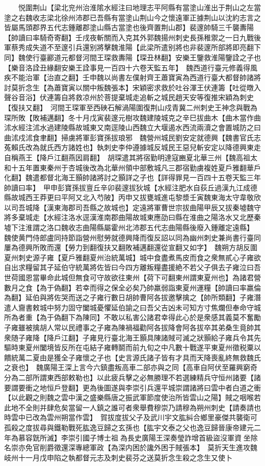 　　悦圍荆山【梁北兖州治淮隂水經注曰地理志平阿縣有當塗山淮出于荆山之左當塗之右魏收志梁北徐州沛郡已吾縣有當塗山荆山今之懷遠軍正據荆山以沈約志言之皆屬馬頭郡界五代志鍾離郡塗山縣古當塗也後齊置荆山郡】裴邃帥騎三千襲夀陽【帥讀曰率騎奇寄翻】壬戌夜斬關而入克其外郭魏揚州刺史長孫稚禦之一日九戰後軍蔡秀成失道不至邃引兵還别將擊魏淮陽【此梁所遣别將也非裴邃所部將即亮翻下同】魏使行臺酈道元都督河間王琛救夀陽【琛丑林翻】安樂王鑒救淮陽鑒詮之子也【樂音洛詮丑緣翻安樂王詮事見一百四十六卷天監五年】　魏西道行臺元修義得風疾不能治軍【治直之翻】壬申魏以尚書左僕射齊王蕭寶寅為西道行臺大都督帥諸將討莫折念生【為蕭寶寅以關中叛魏張本】宋穎密求救於吐谷渾王伏連籌【吐從暾入聲谷音浴】伏連籌自將救凉州於菩提棄城走追斬之城民趙天安等復推宋穎為刺史【復扶又翻】　河間王琛軍至西硤石解渦陽圍復荆山戍青冀二州刺史王神念與戰為琛所敗【敗補邁翻】冬十月戊寅裴邃元樹攻魏建陵城克之辛巳拔曲木【曲木當作曲沭水經注沭水過建陵縣故城東又南逕陵山西魏立大堰遏水西流兩瀆之會置城防之曰曲沭戍沭食聿翻】掃虜將軍彭寶孫拔琅邪　魏營州城民劉安定就德興【魏書官氏志菟賴氏改為就氏西方諸姓也】執刺史李仲遵據城反城民王惡兒斬安定以降德興東走自稱燕王【降戶江翻燕因肩翻】　胡琛遣其將宿勤明達寇豳夏北華三州【魏高祖太和十五年置東秦州于杏城後改為北華州領中部敷城凡三郡宿勤虜複姓夏戶雅翻華戶化翻】魏遣都督北海王顥帥諸將討之顥詳之子也【詳得罪見一百四十五卷天監三年帥讀曰率】　甲申彭寶孫拔亶丘辛卯裴邃拔狄城【水經注肥水自荻丘過漢九江成德縣故城西王莽更曰平阿又北入芍陂】丙申又拔甕城進屯黎漿壬寅魏東海太守韋敬欣以司吾城降【漢東海郡司吾縣之故城也】定遠將軍曹世宗拔曲陽甲辰又拔秦墟魏守將多棄城走【水經注洛水逕漢淮南郡曲陽故城東應劭曰縣在淮曲之陽洛水又北歷秦墟下注淮謂之洛口魏收志曲陽縣屬霍州北沛郡五代志曲陽縣後廢入鍾離定遠縣】　魏使黄門侍郎盧同持節詣營州慰勞就德興降而復反詔以同為幽州刺史兼尚書行臺同屢為德興所敗而還【勞力到翻復扶又翻敗補邁翻還從宣翻又如字】　魏朔方胡反圍夏州刺史源子雍【夏戶雅翻夏州治統萬城】城中食盡煮馬皮而食之衆無貳心子雍欲自出求糧留其子延伯守統萬將佐皆曰今四方離叛糧盡援絶不若父子俱去子雍泣曰吾世荷國恩當畢命此城但無食可守故欲往東州【荷下可翻東州謂東夏州也】為諸君營數月之食【為于偽翻】若幸而得之保全必矣乃帥羸弱詣東夏州運糧【帥讀曰率羸倫為翻】延伯與將佐哭而送之子雍行數日胡帥曹阿各拔邀擊擒之【帥所類翻】子雍潛遣人齎書敕城中努力固守闔城憂懼延伯諭之曰吾父吉凶未可知方寸焦爛但奉命守城所為者重【為于偽翻下為陳同】不敢以私害公諸君幸得此心於是衆感其義莫不奮勵子雍雖被擒胡人常以民禮事之子雍為陳禍福勸阿各拔降會阿各拔卒其弟桑生竟帥其衆随子雍降【降戶江翻】子雍見行臺北海王顥具陳諸賊可滅之狀顥給子雍兵令其先驅時東夏州闔境皆反所在屯結子雍轉鬬而前九旬之中凡數十戰遂平東夏州徵税粟以饋統萬二夏由是獲全子雍懷之子也【史言源氏諸子皆有才具而天降喪亂終無救魏氏之衰也】　魏廣陽王深上言今六鎮盡叛高車二部亦與之同【高車自阿伏至羅興窮奇分為二部所謂東西部敕勒也】以此疲兵擊之必無勝理不若選練精兵守恒州諸要【諸要謂要衝之地恒戶登翻】更為後圖遂與李崇引兵還平城崇謂諸將曰雲中者白道之衝【以此觀之則魏之雲中漢之盛樂縣唐之振武軍節度使治所皆雲山之陽】賊之咽喉若此地不全則并肆危矣當留一人鎮之誰可者衆舉費穆崇乃請穆為朔州刺史【請奏請也時雲中已改為雲州朔當作雲】　賀拔度拔父子及武川宇文肱糾合鄉里豪傑共襲衛可孤殺之度拔尋與鐵勒戰死肱逸豆歸之玄孫也【肱宇文泰之父也逸豆歸晉康帝建元二年為慕容皝所滅】李崇引國子博士祖為長史廣陽王深奏瑩詐增首級盜沒軍資坐除名崇亦免官削爵徵還深專總軍政【為深内困於讒外困于賊張本】　莫折天生進攻魏岐州十一月戊申陷之執都督元志及刺史裴芬之送莫折念生殺之念生又使卜
